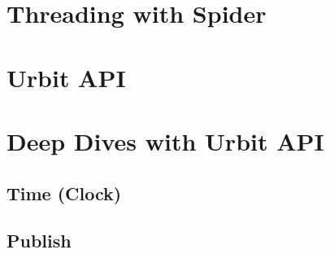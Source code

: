 \section{Threading with Spider}

\section{Urbit API}

\section{Deep Dives with Urbit API}

\subsection{Time (Clock)}

\subsection{Publish}

\subsection{\graphstore}
